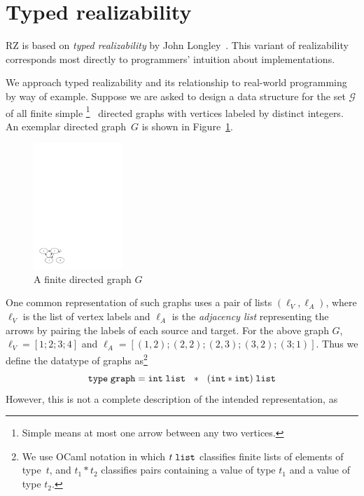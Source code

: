 \section{Typed realizability}
\label{sec:typed-realizability}

RZ is based on \emph{typed realizability} by John
Longley~\cite{Longley99}.   This variant of realizability corresponds most
directly to programmers' intuition about implementations.

We approach typed realizability and its relationship to
real-world programming by way of example. Suppose we are asked to
design a data structure for the set $\mathcal{G}$ of all finite
simple%
\iflong
\footnote{Simple means at most one arrow between any two vertices.}
\fi %
\ directed graphs with vertices labeled by distinct integers. 
%
\iflong
An exemplar
directed graph~$G$ is shown in Figure~\ref{fig:digraph}.
%
\begin{figure}
  \centering
  \includegraphics[width=0.3\textwidth]{digraph}
  \caption{A finite directed graph $G$}
  \label{fig:digraph}
\end{figure}
\fi %
%
One common representation of such graphs uses a pair of lists $(\ell_V, \ell_A)$, where
$\ell_V$ is the list of vertex labels and $\ell_A$ is the \emph{adjacency list} 
representing the arrows by pairing the labels of each source and target.
\iflong
For the above graph $G$,
$\ell_V = [1; 2;
3; 4]$ and $\ell_A = [(1,2); (2,2); (2,3); (3,2); (3;1)]$.
\fi %
%
Thus we define the datatype of graphs as\footnote{We use OCaml
  notation in which $t\;\mathtt{list}$ classifies finite lists of elements of
  type~$t$, and $t_1 * t_2$ classifies pairs containing a value of
  type $t_1$ and a value of type $t_2$.}
%
\begin{equation*}
  \mathtt{type}\; \mathtt{graph} = \mathtt{int}\;\mathtt{list} \ \ * \ \ (\mathtt{int} * \mathtt{int})\;\mathtt{list}
\end{equation*}
%
However, this is not a complete description of the intended representation, as
